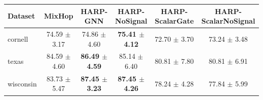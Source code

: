 \begin{tabular}{lccccc}
\toprule
Dataset & MixHop & HARP-GNN & HARP-NoSignal & HARP-ScalarGate & HARP-ScalarNoSignal \\
\midrule
cornell & 74.59 $\pm$ 3.17 & 74.86 $\pm$ 4.60 & \textbf{75.41 $\pm$ 4.12} & 72.70 $\pm$ 3.70 & 73.24 $\pm$ 3.48 \\
texas & 84.59 $\pm$ 4.60 & \textbf{86.49 $\pm$ 4.59} & 85.14 $\pm$ 6.40 & 80.81 $\pm$ 7.80 & 80.81 $\pm$ 6.91 \\
wisconsin & 83.73 $\pm$ 5.47 & \textbf{87.45 $\pm$ 3.23} & \textbf{87.45 $\pm$ 4.26} & 78.24 $\pm$ 4.28 & 77.84 $\pm$ 5.99 \\
\bottomrule
\end{tabular}
